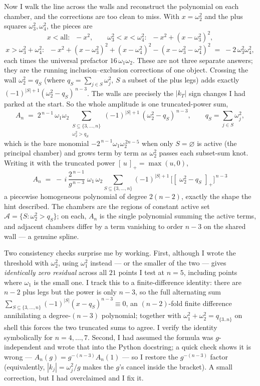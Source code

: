 \documentclass{article}
\newcommand{\pp}[1]{\left[\,#1\,\right]_{+}}
\begin{document}
Now I walk the line across the walls and reconstruct the polynomial on each
chamber, and the corrections are too clean to miss. With $x=\omega_2^2$ and the
plus squares $\omega_3^2,\omega_4^2$, the pieces are
\[
x<\text{all}:\;\; -x^{2},\qquad
\omega_3^2<x<\omega_4^2:\;\; -x^2+(x-\omega_3^2)^2,
\]
\[
x>\omega_3^2+\omega_4^2:\;\; -x^2+(x-\omega_3^2)^2+(x-\omega_4^2)^2-(x-\omega_3^2-\omega_4^2)^2
\;=\; -2\,\omega_3^2\omega_4^2,
\]
each times the universal prefactor $16\,\omega_1\omega_2$. These are not three
separate answers; they are the running inclusion--exclusion corrections of one
object. Crossing the wall $\omega_2^2=q_S$ (where $q_S=\sum_{j\in S}\omega_j^2$,
$S$ a subset of the plus legs) adds exactly $(-1)^{|S|+1}(\omega_2^2-q_S)^{\,n-3}$.
The walls are precisely the $|k_T|$ sign changes I had parked at the start. So the
whole amplitude is one truncated-power sum,
\[
A_n \;=\; 2^{\,n-1}\,\omega_1\omega_2\!\!\sum_{\substack{S\subseteq\{3,\dots,n\}\\ \omega_2^2>q_S}}
(-1)^{|S|+1}\,(\omega_2^2-q_S)^{\,n-3},
\qquad q_S=\sum_{j\in S}\omega_j^2,
\]
which is the bare monomial $-2^{\,n-1}\omega_1\omega_2^{\,2n-5}$ when only
$S=\varnothing$ is active (the principal chamber) and grows term by term as
$\omega_2^2$ passes each subset-sum knot. Writing it with the truncated power
$\pp{u}=\max(u,0)$,
\[
\boxed{\;
A_n \;=\; -\,i\,\frac{2^{\,n-1}}{g^{\,n-3}}\;\omega_1\,\omega_2
\sum_{S\subseteq\{3,\dots,n\}}(-1)^{|S|+1}\,\Big[\pp{\,\omega_2^{2}-q_S\,}\Big]^{\,n-3}\;}
\]
a piecewise homogeneous polynomial of degree $2(n-2)$, exactly the shape the hint
described. The chambers are the regions of constant active set
$\mathcal A=\{S:\omega_2^2>q_S\}$; on each, $A_n$ is the single polynomial summing
the active terms, and adjacent chambers differ by a term vanishing to order $n-3$
on the shared wall --- a genuine spline.

Two consistency checks surprise me by working. First, although I wrote the
threshold with $\omega_2^2$, using $\omega_1^2$ instead --- or the smaller of the
two --- gives \emph{identically zero residual} across all $21$ points I test at
$n=5$, including points where $\omega_1$ is the small one. I track this to a
finite-difference identity: there are $n-2$ plus legs but the power is only
$n-3$, so the full alternating sum
$\sum_{S\subseteq\{3,\dots,n\}}(-1)^{|S|}(x-q_S)^{n-3}\equiv0$, an
$(n-2)$-fold finite difference annihilating a degree-$(n-3)$ polynomial; together
with $\omega_1^2+\omega_2^2=q_{\{3..n\}}$ on shell this forces the two truncated
sums to agree. I verify the identity symbolically for $n=4,\dots,7$. Second, I
had assumed the formula was $g$-independent and wrote that into the Python
docstring; a quick check shows it is wrong --- $A_n(g)=g^{-(n-3)}A_n(1)$ --- so I
restore the $g^{-(n-3)}$ factor (equivalently, $|k_j|=\omega_j^2/g$ makes the
$g$'s cancel inside the bracket). A small correction, but I had overclaimed and I
fix it.
\end{document}
